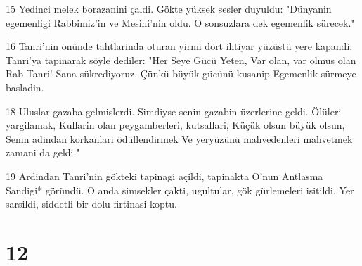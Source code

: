 \par 15 Yedinci melek borazanini çaldi. Gökte yüksek sesler duyuldu: "Dünyanin egemenligi Rabbimiz'in ve Mesihi'nin oldu. O sonsuzlara dek egemenlik sürecek."
\par 16 Tanri'nin önünde tahtlarinda oturan yirmi dört ihtiyar yüzüstü yere kapandi. Tanri'ya tapinarak söyle dediler: "Her Seye Gücü Yeten, Var olan, var olmus olan Rab Tanri! Sana sükrediyoruz. Çünkü büyük gücünü kusanip Egemenlik sürmeye basladin.
\par 18 Uluslar gazaba gelmislerdi. Simdiyse senin gazabin üzerlerine geldi. Ölüleri yargilamak, Kullarin olan peygamberleri, kutsallari, Küçük olsun büyük olsun, Senin adindan korkanlari ödüllendirmek Ve yeryüzünü mahvedenleri mahvetmek zamani da geldi."
\par 19 Ardindan Tanri'nin gökteki tapinagi açildi, tapinakta O'nun Antlasma Sandigi* göründü. O anda simsekler çakti, ugultular, gök gürlemeleri isitildi. Yer sarsildi, siddetli bir dolu firtinasi koptu.

\chapter{12}

